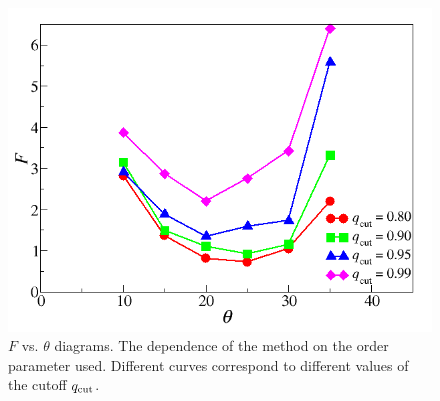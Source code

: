 \begin{figure}
\begin{center}\includegraphics[width=.6\textwidth]{pixel/2SQorderparameter.png}\end{center}
\caption[F vs. $\theta$ for different values of the order parameter $q_{\rm cut}$]{$F$ vs. $\theta$ diagrams.  The dependence of the method on the order parameter used.  Different curves correspond to different values of the  cutoff $q_{\rm cut}$.} \label{orderparameter}	 
\end{figure}

